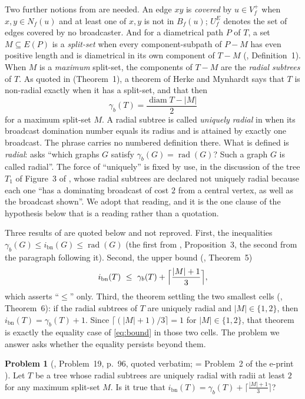 \documentclass[11pt]{amsart}
\theoremstyle{definition}
\newtheorem{problem}[theorem]{Problem}
\DeclareMathOperator{\diam}{diam}
\DeclareMathOperator{\rad}{rad}
\newcommand{\ibn}{i_{\mathrm{bn}}}
\newcommand{\gb}{\gamma_{b}}
\begin{document}
Two further notions from \cite{MM2024} are needed. An edge $xy$ is
\emph{covered} by $u\in V_f^{+}$ when $x,y\in N_f(u)$ and at least one of $x,y$
is not in $B_f(u)$; $U_f^{E}$ denotes the set of edges covered by no
broadcaster. And for a diametrical path $P$ of $T$, a set $M\subseteq E(P)$ is a
\emph{split-set} when every component-subpath of $P-M$ has even positive length
and is diametrical in its own component of $T-M$ (\cite{MM2024},
Definition~1). When $M$ is a \emph{maximum} split-set, the components of $T-M$
are the \emph{radial subtrees} of $T$. As quoted in \cite{MM2024} (Theorem~1), a
theorem of Herke and Mynhardt says that $T$ is non-radial exactly when it has a
split-set, and that then
\begin{equation}\label{eq:HM}
  \gb(T)=\frac{\diam T-|M|}{2}
\end{equation}
for a maximum split-set $M$. A radial subtree is called \emph{uniquely radial}
in \cite{MM2024} when its broadcast domination number equals its radius and is
attained by exactly one broadcast. The phrase carries no numbered definition
there. What is defined is \emph{radial}: \cite{MM2024} asks ``which graphs $G$
satisfy $\gb(G)=\rad(G)$? Such a graph $G$ is called radial''. The force of
``uniquely'' is fixed by use, in the discussion of the tree $T_1$ of Figure~3 of
\cite{MM2024}, whose radial subtrees are declared not uniquely radial because
each one ``has a dominating broadcast of cost $2$ from a central vertex, as well
as the broadcast shown''. We adopt that reading, and it is the one clause of the
hypothesis below that is a reading rather than a quotation.

Three results of \cite{MM2024} are quoted below and not reproved. First, the
inequalities $\gb(G)\le\ibn(G)\le\rad(G)$ (the first from
\cite{MM2024}, Proposition~3, the second from the paragraph following it).
Second, the upper bound (\cite{MM2024}, Theorem~5)
\begin{equation}\label{eq:bound}
  \ibn(T)\ \le\ \gb(T)+\Bigl\lceil\frac{|M|+1}{3}\Bigr\rceil ,
\end{equation}
which asserts ``$\le$'' only. Third, the theorem settling the two smallest
cells (\cite{MM2024}, Theorem~6): if the radial subtrees of $T$ are uniquely
radial and $|M|\in\{1,2\}$, then $\ibn(T)=\gb(T)+1$. Since
$\lceil(|M|+1)/3\rceil=1$ for $|M|\in\{1,2\}$,
that theorem is exactly the equality case of \eqref{eq:bound} in those two
cells. The problem we answer asks whether the equality persists beyond them.

\begin{problem}[\cite{MM2024}, Problem~19, p.~96, quoted verbatim; = Problem~2
of the e-print \cite{MM2021}]\label{prob:19}
Let $T$ be a tree whose radial subtrees are uniquely radial with radii at least
$2$ for any maximum split-set $M$. Is it true that
$\ibn(T)=\gb(T)+\bigl\lceil\frac{|M|+1}{3}\bigr\rceil$?
\end{problem}
\end{document}
